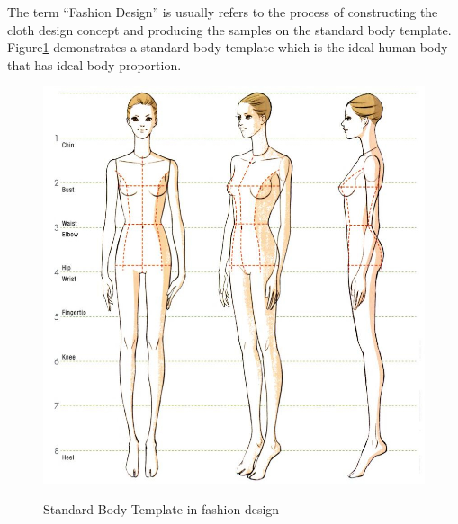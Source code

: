 
The term ``Fashion Design'' is usually refers to the process of constructing the cloth design concept and producing the samples on the standard body template. Figure\ref{figure:SBT} demonstrates a standard body template which is the ideal human body that has ideal body proportion. 

 \begin{figure}[H]
    \centering
	\includegraphics[width=0.9\columnwidth]{../images/cloth_design/standard_body_template}\\[1cm]
    \caption{Standard Body Template in fashion design}
    \label{figure:SBT}
\end{figure} 

